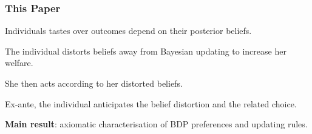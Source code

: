 \documentclass[usenames,dvipsnames,aspectratio=169,11pt, envcountsect, handout]{beamer}
\begin{document}
\begin{frame}\frametitle{This Paper}

	Individuals tastes over outcomes depend on their posterior beliefs.

	\vfill

	The individual distorts beliefs away from Bayesian updating to increase her welfare.

	\vfill

	She then acts according to her distorted beliefs.

	\vfill

	Ex-ante, the individual anticipates the belief distortion and the related choice.

	\vfill

	\textbf{Main result}: axiomatic characterisation of BDP preferences and updating rules.

\end{frame}
\end{document}
